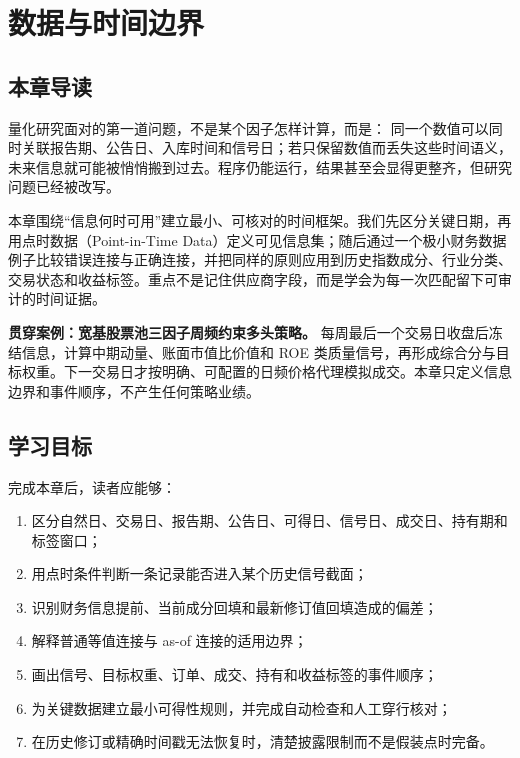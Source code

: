 \chapter{数据与时间边界}
\label{ch:data-timing}

\section{本章导读}

量化研究面对的第一道问题，不是某个因子怎样计算，而是： 同一个数值可以同时关联报告期、公告日、入库时间和信号日；若只保留数值而丢失这些时间语义，未来信息就可能被悄悄搬到过去。程序仍能运行，结果甚至会显得更整齐，但研究问题已经被改写。

本章围绕“信息何时可用”建立最小、可核对的时间框架。我们先区分关键日期，再用点时数据（Point-in-Time Data）定义可见信息集；随后通过一个极小财务数据例子比较错误连接与正确连接，并把同样的原则应用到历史指数成分、行业分类、交易状态和收益标签。重点不是记住供应商字段，而是学会为每一次匹配留下可审计的时间证据。

\begin{casebox}
\textbf{贯穿案例：宽基股票池三因子周频约束多头策略。} 每周最后一个交易日收盘后冻结信息，计算中期动量、账面市值比价值和 ROE 类质量信号，再形成综合分与目标权重。下一交易日才按明确、可配置的日频价格代理模拟成交。本章只定义信息边界和事件顺序，不产生任何策略业绩。
\end{casebox}

\section{学习目标}

完成本章后，读者应能够：

\begin{enumerate}
  \item 区分自然日、交易日、报告期、公告日、可得日、信号日、成交日、持有期和标签窗口；
  \item 用点时条件判断一条记录能否进入某个历史信号截面；
  \item 识别财务信息提前、当前成分回填和最新修订值回填造成的偏差；
  \item 解释普通等值连接与 as-of 连接的适用边界；
  \item 画出信号、目标权重、订单、成交、持有和收益标签的事件顺序；
  \item 为关键数据建立最小可得性规则，并完成自动检查和人工穿行核对；
  \item 在历史修订或精确时间戳无法恢复时，清楚披露限制而不是假装点时完备。
\end{enumerate}

